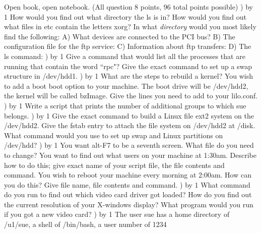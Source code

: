 
\parindent=0in
\nopagenumbers
\newcount\quesno
{}
\def\ques{\number\quesno) \advance\quesno by 1}
\def\aspace{\vskip 1.5in}

Open book, open notebook. (All question 8 points, 96 total points possible)
\hfill\break
\ques
How would you find out what directory the {\ltt{}ls} is in?
\vskip 0.4in
How would you find out what files in {\ltt{}etc} contain the letters
{\ltt{}xorg}?
\vskip 0.4in
In what {\it directory} would you most likely find
the following:
\hfill\break
A) What devices are connected to the PCI bus?
\vskip 0.3in
B) The configuration file for the ftp service:
\vskip 0.3in
C) Information about ftp transfers:
\vskip 0.3in
D) The {\ltt{}ls} command:
\vskip 0.3in
\ques
Give a command that would list all the processes that are running that
contain the word ``rpc"?
\vskip 0.4in
Give the exact command to set up a swap structure in
{\ltt{}/dev/hdd1}.
\vskip 0.4in
\ques
What are the steps to rebuild a kernel?
\vskip 1.5in
You wish to add a boot boot option to your machine.
The boot drive will be {\ltt{}/dev/hdd2}, the kernel will
be called {\ltt{}bzImage}.
Give the lines you need to add to your {\ltt{}lilo.conf}.
\vskip 1.8in
\vfill\eject
\ques
Write a script that prints the number of additional groups to which
{\ltt{}sue} belongs.
\vskip 1.5in
\ques
Give the exact command to build a Linux file ext2 system on the
{\ltt{}/dev/hdd2}.
\vskip 0.4in
Give the {\ltt{}fstab} entry to attach the file system
on {\ltt{}/dev/hdd2} at {\ltt{}/disk}.
\vskip 0.4in
What command would you use to set up swap and Linux partitions on
{\ltt{}/dev/hdd}?
\vskip 0.4in
\ques
You want alt-F7 to be a seventh screen.
What file do you need to change?
\vskip 0.4in
You want to find out what users on your machine at 1:30am.
Describe how to do this; give exact name of your script file, the file contents
and command.
\vskip 1.7in
You wish to reboot your machine every morning at 2:00am. 
How can you do this? Give file name, file contents and command.
\vskip 1.4in
\vfill\eject
\ques
What command do you run to find out which video card driver got loaded?
\vskip 0.4in
How do you find out the current resolution of your X-windows display?
\vskip 0.4in
What program would you run if you got a new video card?
\vskip 0.4in
\ques
The user {\ltt{}sue} has  a home directory of {\ltt{}/u1/sue},
a shell of {\ltt{}/bin/bash}, a user number of {\ltt{}1234}
